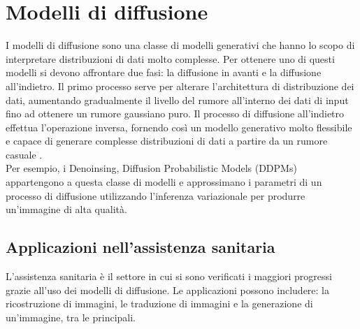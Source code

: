 \section{Modelli di diffusione}
I modelli di diffusione sono una classe di modelli generativi che hanno lo scopo di interpretare distribuzioni di dati molto complesse.
Per ottenere uno di questi modelli si devono affrontare due fasi: la diffusione in avanti e la diffusione all'indietro.
Il primo processo serve per alterare l'architettura di distribuzione dei dati, aumentando gradualmente il livello del rumore all'interno dei dati di input fino ad ottenere un rumore gaussiano puro.
Il processo di diffusione all'indietro effettua l'operazione inversa, fornendo così un modello generativo molto flessibile e capace di generare complesse distribuzioni di dati a partire da un rumore casuale \cite{shokrollahi2023comprehensive}.\\
Per esempio, i Denoinsing, Diffusion Probabilistic Models (DDPMs) appartengono a questa classe di modelli e approssimano i parametri di un processo di diffusione utilizzando l'inferenza variazionale per produrre un'immagine di alta qualità.\cite{ho2020denoising}

\subsection{Applicazioni nell'assistenza sanitaria}
L'assistenza sanitaria è il settore in cui si sono verificati i maggiori progressi grazie all'uso dei modelli di diffusione. Le applicazioni possono includere: la ricostruzione di immagini, le traduzione di immagini e la generazione di un'immagine, tra le principali.
